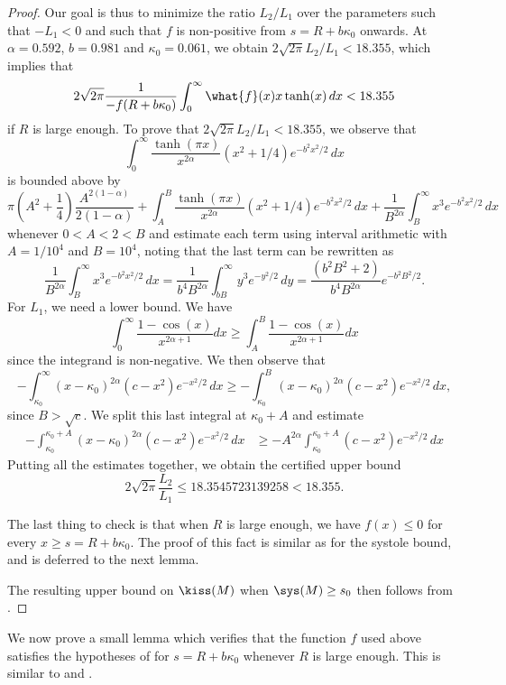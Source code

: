 \documentclass[12pt]{amsart}
\numberwithin{equation}{section}
\begin{document}
\begin{proof}
Our goal is thus to minimize the ratio $L_2/L_1$ over the parameters such that $-L_1 < 0$ and such that $f$ is non-positive from $s=R+b\kappa_0$ onwards. At $\alpha = 0.592$, $b = 0.981$ and $\kappa_0 = 0.061$, we obtain $2\sqrt{2\pi} L_2/L_1 < 18.355$, which implies that
\[
2\sqrt{2\pi}\frac{1}{-f(R+b\kappa_0)}\int_0^\infty \what{f}(x) x \tanh(x)\,dx  < 18.355 
\]
if $R$ is large enough. To prove that $2\sqrt{2\pi} L_2/L_1 < 18.355$, we observe that
\[
\int_0^\infty \frac{\tanh(\pi x)}{x^{2\alpha}}(x^2+1/4)e^{-b^2x^2/2}\,dx
\]
is bounded above by 
\[
\pi\left(A^2+\frac14\right) \frac{A^{2(1-\alpha)}}{2(1-\alpha)} + \int_A^B \frac{\tanh(\pi x)}{x^{2\alpha}}(x^2+1/4)e^{-b^2x^2/2}\,dx + \frac{1}{B^{2\alpha}}\int_B^\infty x^3 e^{-b^2x^2/2}\,dx
\]
whenever $0<A < 2 < B$ and estimate each term using interval arithmetic with $A=1/10^4$ and $B=10^4$, noting that the last term can be rewritten as
\[
\frac{1}{B^{2\alpha}}\int_B^\infty x^3 e^{-b^2x^2/2}\,dx = \frac{1}{b^4 B^{2\alpha}} \int_{bB}^\infty y^3e^{-y^2/2}\,dy =  \frac{(b^2 B^2 +2)}{b^4 B^{2\alpha}} e^{-b^2B^2/2}.
\]
For $L_1$, we need a lower bound. We have
\[
\int_0^\infty \frac{1-\cos(x)}{x^{2\alpha+1}}dx \geq \int_A^B\frac{1-\cos(x)}{x^{2\alpha+1}}dx
\]
since the integrand is non-negative. We then observe that
\[
-\int_{\kappa_0}^\infty (x-\kappa_0)^{2\alpha}(c-x^2)e^{-x^2/2}\,dx \geq -\int_{\kappa_0}^B (x-\kappa_0)^{2\alpha}(c-x^2)e^{-x^2/2}\,dx,
\]
since $B > \sqrt{c}$. We split this last integral at $\kappa_0+A$ and estimate
\begin{align*}
-\int_{\kappa_0}^{\kappa_0+A} (x-\kappa_0)^{2\alpha}(c-x^2)e^{-x^2/2}\,dx &\geq -A^{2\alpha} \int_{\kappa_0}^{\kappa_0+A} (c-x^2)e^{-x^2/2}\,dx
\end{align*}
Putting all the estimates together, we obtain the certified upper bound
\[
2\sqrt{2\pi} \frac{L_2}{L_1} \leq 18.3545723139258 < 18.355.
\]

The last thing to check is that when $R$ is large enough, we have $f(x)\leq 0$ for every $x \geq s = R+b\kappa_0$. The proof of this fact is similar as for the systole bound, and is deferred to the next lemma. 

The resulting upper bound on $\kiss(M)$ when $\sys(M)\geq s_0$ then follows from .
\end{proof}

We now prove a small lemma which verifies that the function $f$ used above satisfies the hypotheses of  for $s=R+b\kappa_0$ whenever $R$ is large enough. This is similar to  and .
\end{document}
